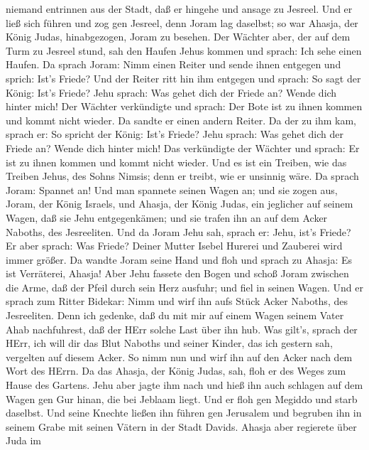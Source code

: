 niemand entrinnen aus der Stadt, daß er hingehe und ansage zu Jesreel.
 Und er ließ sich führen und zog gen Jesreel, denn Joram
lag daselbst; so war Ahasja, der König Judas, hinabgezogen, Joram zu
besehen.  Der Wächter aber, der auf dem Turm zu Jesreel
stund, sah den Haufen Jehus kommen und sprach: Ich sehe einen Haufen. Da
sprach Joram: Nimm einen Reiter und sende ihnen entgegen und sprich:
Ist's Friede?  Und der Reiter ritt hin ihm entgegen und
sprach: So sagt der König: Ist's Friede? Jehu sprach: Was gehet dich der
Friede an? Wende dich hinter mich! Der Wächter verkündigte und sprach:
Der Bote ist zu ihnen kommen und kommt nicht wieder.  Da
sandte er einen andern Reiter. Da der zu ihm kam, sprach er: So spricht
der König: Ist's Friede? Jehu sprach: Was gehet dich der Friede an?
Wende dich hinter mich!  Das verkündigte der Wächter und
sprach: Er ist zu ihnen kommen und kommt nicht wieder. Und es ist ein
Treiben, wie das Treiben Jehus, des Sohns Nimsis; denn er treibt, wie er
unsinnig wäre.  Da sprach Joram: Spannet an! Und man
spannete seinen Wagen an; und sie zogen aus, Joram, der König Israels,
und Ahasja, der König Judas, ein jeglicher auf seinem Wagen, daß sie
Jehu entgegenkämen; und sie trafen ihn an auf dem Acker Naboths, des
Jesreeliten.  Und da Joram Jehu sah, sprach er: Jehu, ist's
Friede? Er aber sprach: Was Friede? Deiner Mutter Isebel Hurerei und
Zauberei wird immer größer.  Da wandte Joram seine Hand und
floh und sprach zu Ahasja: Es ist Verräterei, Ahasja!  Aber
Jehu fassete den Bogen und schoß Joram zwischen die Arme, daß der Pfeil
durch sein Herz ausfuhr; und fiel in seinen Wagen.  Und er
sprach zum Ritter Bidekar: Nimm und wirf ihn aufs Stück Acker Naboths,
des Jesreeliten. Denn ich gedenke, daß du mit mir auf einem Wagen seinem
Vater Ahab nachfuhrest, daß der HErr solche Last über ihn hub.
 Was gilt's, sprach der HErr, ich will dir das Blut Naboths
und seiner Kinder, das ich gestern sah, vergelten auf diesem Acker. So
nimm nun und wirf ihn auf den Acker nach dem Wort des HErrn.
 Da das Ahasja, der König Judas, sah, floh er des Weges zum
Hause des Gartens. Jehu aber jagte ihm nach und hieß ihn auch schlagen
auf dem Wagen gen Gur hinan, die bei Jeblaam liegt. Und er floh gen
Megiddo und starb daselbst.  Und seine Knechte ließen ihn
führen gen Jerusalem und begruben ihn in seinem Grabe mit seinen Vätern
in der Stadt Davids.  Ahasja aber regierete über Juda im
